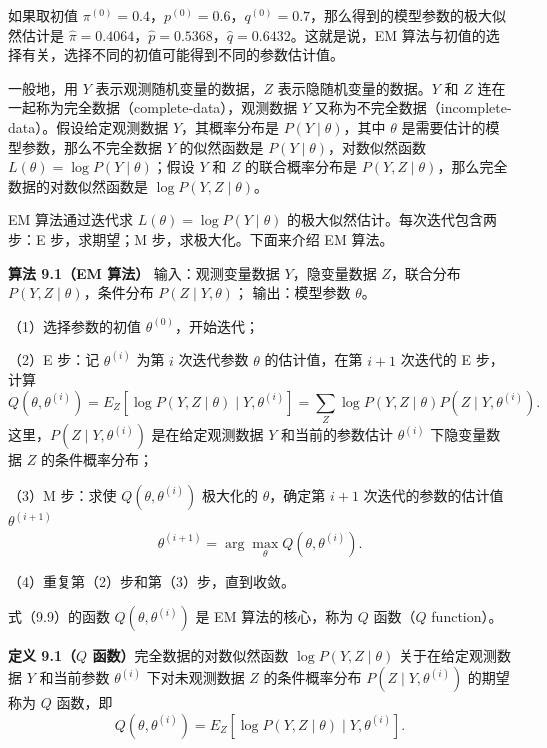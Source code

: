 \documentclass[UTF8,12pt,a4paper,fontset=fandol]{ctexart}
\begin{document}
如果取初值 $\pi^{(0)}=0.4$，$p^{(0)}=0.6$，$q^{(0)}=0.7$，那么得到的模型参数的极大似然估计是 $\hat{\pi}=0.4064$，$\hat{p}=0.5368$，$\hat{q}=0.6432$。这就是说，EM 算法与初值的选择有关，选择不同的初值可能得到不同的参数估计值。

一般地，用 $Y$ 表示观测随机变量的数据，$Z$ 表示隐随机变量的数据。$Y$ 和 $Z$ 连在一起称为完全数据（complete-data），观测数据 $Y$ 又称为不完全数据（incomplete-data）。假设给定观测数据 $Y$，其概率分布是 $P(Y\mid\theta)$，其中 $\theta$ 是需要估计的模型参数，那么不完全数据 $Y$ 的似然函数是 $P(Y\mid\theta)$，对数似然函数 $L(\theta)=\log P(Y\mid\theta)$；假设 $Y$ 和 $Z$ 的联合概率分布是 $P(Y,Z\mid\theta)$，那么完全数据的对数似然函数是 $\log P(Y,Z\mid\theta)$。

EM 算法通过迭代求 $L(\theta)=\log P(Y\mid\theta)$ 的极大似然估计。每次迭代包含两步：E 步，求期望；M 步，求极大化。下面来介绍 EM 算法。

\noindent\textbf{算法 9.1（EM 算法）}\quad
输入：观测变量数据 $Y$，隐变量数据 $Z$，联合分布 $P(Y,Z\mid\theta)$，条件分布 $P(Z\mid Y,\theta)$；
输出：模型参数 $\theta$。

（1）选择参数的初值 $\theta^{(0)}$，开始迭代；

（2）E 步：记 $\theta^{(i)}$ 为第 $i$ 次迭代参数 $\theta$ 的估计值，在第 $i+1$ 次迭代的 E 步，计算
\begin{equation}
  Q(\theta,\theta^{(i)})
  =E_Z[\log P(Y,Z\mid\theta)\mid Y,\theta^{(i)}]
  =\sum_Z \log P(Y,Z\mid\theta)P(Z\mid Y,\theta^{(i)}).
  \tag{9.9}
\end{equation}
这里，$P(Z\mid Y,\theta^{(i)})$ 是在给定观测数据 $Y$ 和当前的参数估计 $\theta^{(i)}$ 下隐变量数据 $Z$ 的条件概率分布；

（3）M 步：求使 $Q(\theta,\theta^{(i)})$ 极大化的 $\theta$，确定第 $i+1$ 次迭代的参数的估计值 $\theta^{(i+1)}$
\begin{equation}
  \theta^{(i+1)}=\arg\max_{\theta} Q(\theta,\theta^{(i)}).
  \tag{9.10}
\end{equation}

（4）重复第（2）步和第（3）步，直到收敛。

式（9.9）的函数 $Q(\theta,\theta^{(i)})$ 是 EM 算法的核心，称为 $Q$ 函数（$Q$ function）。

\noindent\textbf{定义 9.1（$Q$ 函数）}\quad 完全数据的对数似然函数 $\log P(Y,Z\mid\theta)$ 关于在给定观测数据 $Y$ 和当前参数 $\theta^{(i)}$ 下对未观测数据 $Z$ 的条件概率分布 $P(Z\mid Y,\theta^{(i)})$ 的期望称为 $Q$ 函数，即
\begin{equation}
  Q(\theta,\theta^{(i)})=E_Z[\log P(Y,Z\mid\theta)\mid Y,\theta^{(i)}].
  \tag{9.11}
\end{equation}
\end{document}
